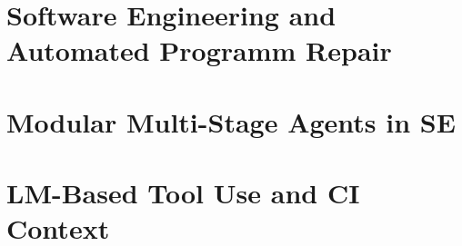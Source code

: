 \section{Software Engineering and Automated Programm Repair}

\section{Modular Multi-Stage Agents in SE}

\section{LM-Based Tool Use and CI Context}

